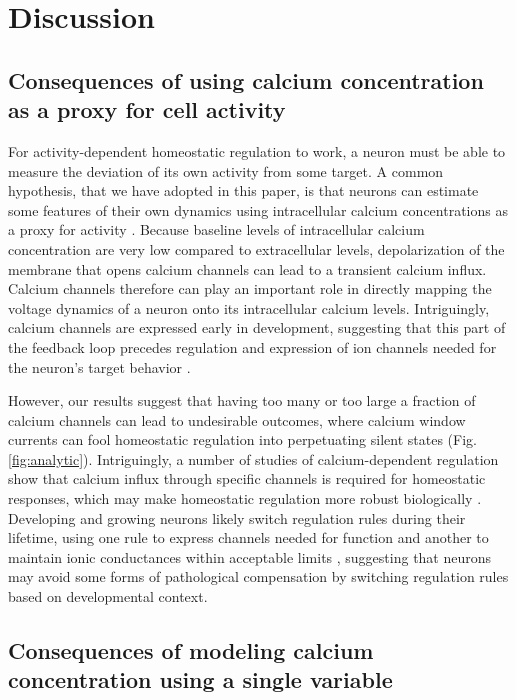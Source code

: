 \documentclass[9pt,lineno]{elife}
\begin{document}
\section{Discussion}


\subsection{Consequences of using calcium concentration as a proxy for cell activity}

For activity-dependent homeostatic regulation to work, a neuron must be able to measure the deviation of its own activity from some target. A common hypothesis, that we have adopted in this paper, is that neurons can estimate some features of their own dynamics using intracellular calcium concentrations as a proxy for activity \citep{LeMasson:1993jz,Siegel:1994ue,Gunay:2010jh,Golowasch:1999ha,Davis:2006wd,OLeary:2011fd}. Because baseline levels of intracellular calcium concentration are very low compared to extracellular levels, depolarization of the membrane that opens calcium channels can lead to a transient calcium influx. Calcium channels therefore can play an important role in directly mapping the voltage dynamics of a neuron onto its intracellular calcium levels. Intriguingly, calcium channels are expressed early in development, suggesting that this part of the feedback loop precedes regulation and expression of ion channels needed for the neuron's target behavior \citep{Baccaglini:1977, Liljelund:2000em, Yamashita:1993fy, Faure:2001gg,Heusser:2005jz}.

However, our results suggest that having too many or too large a fraction of calcium channels can lead to undesirable outcomes, where calcium window currents can fool homeostatic regulation into perpetuating silent states (Fig. \ref{fig:analytic}). Intriguingly, a number of studies of calcium-dependent regulation show that calcium influx through specific channels is required for homeostatic responses, which may make homeostatic regulation more robust biologically \citep{OLeary:2010hq,wheeler2012cav1}. Developing and growing neurons likely switch regulation rules during their lifetime, using one rule to express channels needed for function and another to maintain ionic conductances within acceptable limits  \citep{Desai:1999ib}, suggesting that neurons may avoid some forms of pathological compensation by switching regulation rules based on developmental context. 


\subsection{Consequences of modeling calcium concentration using a single variable}
\end{document}
